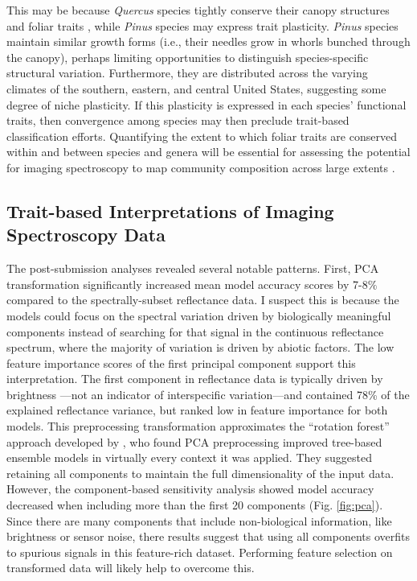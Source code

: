 This may be because \textit{Quercus} species tightly conserve their canopy structures and foliar traits \cite{Cavender-Bares2016-il}, while \textit{Pinus} species may express trait plasticity. \textit{Pinus} species maintain similar growth forms (i.e., their needles grow in whorls bunched through the canopy), perhaps limiting opportunities to distinguish species-specific structural variation. Furthermore, they are distributed across the varying climates of the southern, eastern, and central United States, suggesting some degree of niche plasticity. If this plasticity is expressed in each species’ functional traits, then convergence among species may then preclude trait-based classification efforts. Quantifying the extent to which foliar traits are conserved within and between species and genera will be essential for assessing the potential for imaging spectroscopy to map community composition across large extents \cite{Violle2012-nl, Siefert2015-sk}.

\subsection{Trait-based Interpretations of Imaging Spectroscopy Data}

The post-submission analyses revealed several notable patterns. First, PCA transformation significantly increased mean model accuracy scores by 7-8$\%$ compared to the spectrally-subset reflectance data. I suspect this is because the models could focus on the spectral variation driven by biologically meaningful components instead of searching for that signal in the continuous reflectance spectrum, where the majority of variation is driven by abiotic factors. The low feature importance scores of the first principal component support this interpretation. The first component in reflectance data is typically driven by brightness
—not an indicator of interspecific variation—and contained 78\% of the explained reflectance variance, but ranked low in feature importance for both models. This preprocessing transformation approximates the “rotation forest” approach developed by \cite{Rodriguez2006-ha}, who found PCA preprocessing improved tree-based ensemble models in virtually every context it was applied. They suggested retaining all components to maintain the full dimensionality of the input data. However, the component-based sensitivity analysis showed model accuracy decreased when including more than the first 20 components (Fig. \ref{fig:pca}). Since there are many components that include non-biological information, like brightness or sensor noise, there results suggest that using all components overfits to spurious signals in this feature-rich dataset. Performing feature selection on transformed data will likely help to overcome this. 

